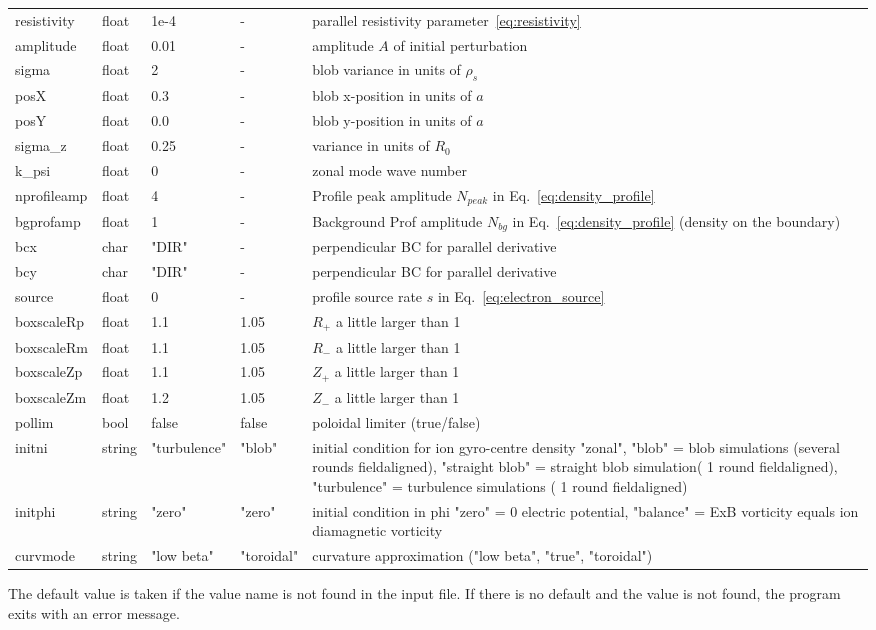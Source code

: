\begin{longtable}{llll>{\RaggedRight}p{7cm}}
resistivity & float &1e-4  & - & parallel resistivity parameter~\eqref{eq:resistivity}\\
amplitude  & float &0.01   & - & amplitude $A$ of initial perturbation \\
sigma      & float &2      & - & blob variance in units of $\rho_s$ \\
posX       & float &0.3    & - & blob x-position in units of $a$\\
posY       & float &0.0    & - & blob y-position in units of $a$ \\
sigma\_z    & float &0.25   & - & variance in units of $R_0$  \\
k\_psi     & float &0    & - & zonal mode wave number  \\
nprofileamp& float &4   & - & Profile peak amplitude $N_{peak}$ in Eq.~\eqref{eq:density_profile} \\
bgprofamp  & float &1   & - & Background Prof amplitude $N_{bg}$ in Eq.~\eqref{eq:density_profile} (density on the boundary) \\
bcx     & char & "DIR"      & - & perpendicular BC for parallel derivative \\
bcy     & char & "DIR"      & - & perpendicular BC for parallel derivative \\
    source  & float & 0     & - & profile source rate $s$ in Eq.~\eqref{eq:electron_source} \\
boxscaleRp  & float & 1.1     & 1.05 & $R_+$ a little larger than 1\\
boxscaleRm  & float & 1.1     & 1.05 & $R_-$ a little larger than 1 \\
boxscaleZp  & float & 1.1     & 1.05 & $Z_+$ a little larger than 1 \\
boxscaleZm  & float & 1.2     & 1.05 & $Z_-$ a little larger than 1 \\
pollim    & bool & false     & false & poloidal limiter (true/false) \\
initni    & string & "turbulence"     & "blob"  & initial condition for ion gyro-centre density "zonal",
    "blob" = blob simulations (several rounds fieldaligned),
    "straight blob" = straight blob simulation( 1 round fieldaligned),
    "turbulence" = turbulence simulations ( 1 round fieldaligned)\\
initphi   & string & "zero"  & "zero" & initial condition in phi "zero" = 0 electric potential, "balance" = ExB vorticity equals ion diamagnetic vorticity \\
curvmode  & string & "low beta"  & "toroidal"& curvature approximation ("low beta", "true", "toroidal") \\
\bottomrule
\end{longtable}
The default value is taken if the value name is not found in the input file. If there is no default and
the value is not found,
the program exits with an error message.
